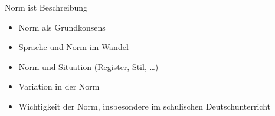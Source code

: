 \begin{frame}
  {Norm ist Beschreibung}
  \pause
  \begin{itemize}[<+->]
    \item Norm als Grundkonsens
    \item Sprache und Norm im Wandel
    \item Norm und Situation (Register, Stil, \dots)
    \item Variation in der Norm
      \vspace{\baselineskip}
    \item \alert{Wichtigkeit der Norm, insbesondere im schulischen Deutschunterricht}
  \end{itemize}
\end{frame}


